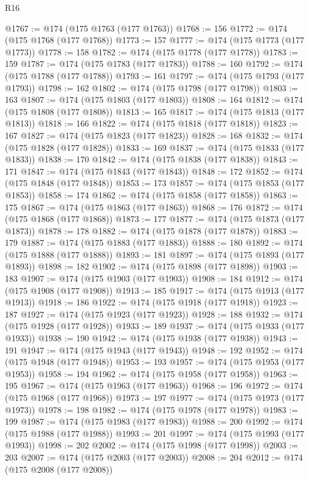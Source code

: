 \begin{lexlean}{R16}
\begin{coremodule}
@1767 := @174 (@175 @1763 (@177 @1763))
@1768 := 156
@1772 := @174 (@175 @1768 (@177 @1768))
@1773 := 157
@1777 := @174 (@175 @1773 (@177 @1773))
@1778 := 158
@1782 := @174 (@175 @1778 (@177 @1778))
@1783 := 159
@1787 := @174 (@175 @1783 (@177 @1783))
@1788 := 160
@1792 := @174 (@175 @1788 (@177 @1788))
@1793 := 161
@1797 := @174 (@175 @1793 (@177 @1793))
@1798 := 162
@1802 := @174 (@175 @1798 (@177 @1798))
@1803 := 163
@1807 := @174 (@175 @1803 (@177 @1803))
@1808 := 164
@1812 := @174 (@175 @1808 (@177 @1808))
@1813 := 165
@1817 := @174 (@175 @1813 (@177 @1813))
@1818 := 166
@1822 := @174 (@175 @1818 (@177 @1818))
@1823 := 167
@1827 := @174 (@175 @1823 (@177 @1823))
@1828 := 168
@1832 := @174 (@175 @1828 (@177 @1828))
@1833 := 169
@1837 := @174 (@175 @1833 (@177 @1833))
@1838 := 170
@1842 := @174 (@175 @1838 (@177 @1838))
@1843 := 171
@1847 := @174 (@175 @1843 (@177 @1843))
@1848 := 172
@1852 := @174 (@175 @1848 (@177 @1848))
@1853 := 173
@1857 := @174 (@175 @1853 (@177 @1853))
@1858 := 174
@1862 := @174 (@175 @1858 (@177 @1858))
@1863 := 175
@1867 := @174 (@175 @1863 (@177 @1863))
@1868 := 176
@1872 := @174 (@175 @1868 (@177 @1868))
@1873 := 177
@1877 := @174 (@175 @1873 (@177 @1873))
@1878 := 178
@1882 := @174 (@175 @1878 (@177 @1878))
@1883 := 179
@1887 := @174 (@175 @1883 (@177 @1883))
@1888 := 180
@1892 := @174 (@175 @1888 (@177 @1888))
@1893 := 181
@1897 := @174 (@175 @1893 (@177 @1893))
@1898 := 182
@1902 := @174 (@175 @1898 (@177 @1898))
@1903 := 183
@1907 := @174 (@175 @1903 (@177 @1903))
@1908 := 184
@1912 := @174 (@175 @1908 (@177 @1908))
@1913 := 185
@1917 := @174 (@175 @1913 (@177 @1913))
@1918 := 186
@1922 := @174 (@175 @1918 (@177 @1918))
@1923 := 187
@1927 := @174 (@175 @1923 (@177 @1923))
@1928 := 188
@1932 := @174 (@175 @1928 (@177 @1928))
@1933 := 189
@1937 := @174 (@175 @1933 (@177 @1933))
@1938 := 190
@1942 := @174 (@175 @1938 (@177 @1938))
@1943 := 191
@1947 := @174 (@175 @1943 (@177 @1943))
@1948 := 192
@1952 := @174 (@175 @1948 (@177 @1948))
@1953 := 193
@1957 := @174 (@175 @1953 (@177 @1953))
@1958 := 194
@1962 := @174 (@175 @1958 (@177 @1958))
@1963 := 195
@1967 := @174 (@175 @1963 (@177 @1963))
@1968 := 196
@1972 := @174 (@175 @1968 (@177 @1968))
@1973 := 197
@1977 := @174 (@175 @1973 (@177 @1973))
@1978 := 198
@1982 := @174 (@175 @1978 (@177 @1978))
@1983 := 199
@1987 := @174 (@175 @1983 (@177 @1983))
@1988 := 200
@1992 := @174 (@175 @1988 (@177 @1988))
@1993 := 201
@1997 := @174 (@175 @1993 (@177 @1993))
@1998 := 202
@2002 := @174 (@175 @1998 (@177 @1998))
@2003 := 203
@2007 := @174 (@175 @2003 (@177 @2003))
@2008 := 204
@2012 := @174 (@175 @2008 (@177 @2008))

\end{coremodule}
\end{lexlean}
